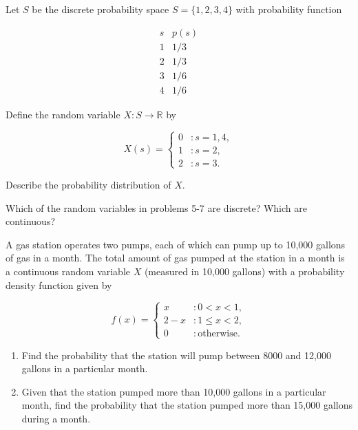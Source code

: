\documentclass[12pt,reqno]{amsart}
\begin{document}
\bigskip
\prob Let $S$ be the discrete probability space $S = \{1,2,3,4\}$ with probability function

	\[
	\begin{array}{c|c}
	s & p(s) \\ \hline
	1 & 1/3\\
	2 & 1/3\\
	3 & 1/6\\
	4 & 1/6
	\end{array}
	\]

Define the random variable $X:S\to \mathbb{R}$ by

	\[
	X(s) = \begin{cases}
	0 & : s = 1, 4, \\
	1 & : s=2, \\
	2 & : s=3.
	\end{cases}
	\]

Describe the probability distribution of $X$.\vfill












\newpage
\prob Which of the random variables in problems 5-7 are discrete? Which are continuous?\vfill















\bigskip
\prob A gas station operates two pumps, each of which can pump up to 10,000 gallons of gas in a month. The total amount of gas pumped at the station in a month is a continuous random variable $X$ (measured in 10,000 gallons) with a probability density function given by

	\[
	f(x) = \begin{cases}
	x & : 0 < x < 1, \\
	2-x & : 1 \leq x < 2, \\
	0 & : \text{otherwise}.
	\end{cases}
	\]

\medskip
\begin{enumerate}
\item Find the probability that the station will pump between 8000 and 12,000 gallons in a particular month.\vfill
\item Given that the station pumped more than 10,000 gallons in a particular month, find the probability that the station pumped more than 15,000 gallons during a month.\vfill
\end{enumerate}
\end{document}
